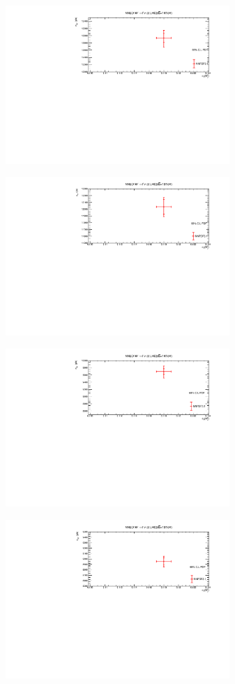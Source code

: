 \begin{figure}[H]
\centering
\begin{subfigure}{0.49\textwidth}
\includegraphics[height=6cm ,width=\textwidth]{chapter4/Wp14.pdf}

\caption{}
\label{w+14}
\end{subfigure}
\begin{subfigure}{0.49\textwidth}
\includegraphics[height=6cm, width=\textwidth]{chapter4/Wp13.pdf}
\caption{}
\label{w+13}
\end{subfigure}
\begin{subfigure}{0.49\textwidth}
\includegraphics[height=6cm, width=\textwidth]{chapter4/Wm14.pdf}

\caption{}
\label{w-14}
\end{subfigure}
\begin{subfigure}{0.49\textwidth}
\includegraphics[height=6cm, width=\textwidth]{chapter4/Wm13.pdf}


\end{subfigure}
\end{figure}

